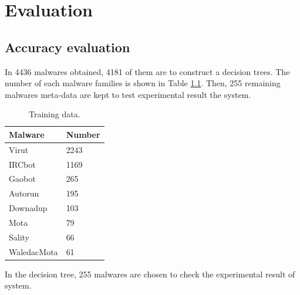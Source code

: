 \chapter{Evaluation}\label{chap:6}


\section{Accuracy evaluation}

In 4436 malwares obtained, 4181 of them are to construct a decision trees. The number of each malware families is shown in Table \ref{table:trainingdata}. Then, 255 remaining malwares meta-data are kept to test experimental result the system.
\begin{table}
  \begin{center}
    \begin{tabular}{ | l | l |}
     \hline
    Malware & Number\\ \hline
    Virut & 2243\\ \hline
	IRCbot & 1169\\ \hline
	Gaobot  & 265\\ \hline
	Autorun & 195\\ \hline
	Downadup &  103\\ \hline
	Mota & 79\\ \hline
	Sality  & 66  \\ \hline
	WaledacMota & 61\\ \hline
    \end{tabular}
	\end{center}
     \caption{Training data.}
      \label{table:trainingdata}
\end{table}

In the decision tree, 255 malwares are chosen to check the experimental result of system. 


